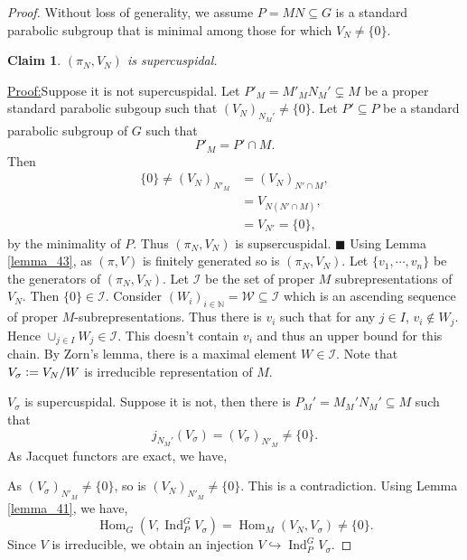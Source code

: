 \documentclass[8pt]{article}
\newtheorem{claim}{Claim}
\newenvironment{claimproof}[1]{\par\noindent\underline{Proof:}\space#1}{\hfill $\blacksquare$}
\DeclareMathOperator{\Ind}{Ind}
\DeclareMathOperator{\Hom}{Hom}
\newcommand{\defeq}{\vcentcolon=}
\newcommand{\N}[0]{\mathbb{N}}
\begin{document}
  \setcounter{claim}{0}
\begin{proof}
  Without loss of generality, we assume $P=MN\subseteq G$ is a standard parabolic subgroup that is minimal among those for which $V_N\not=\{0\}$.
  \begin{claim}
    $(\pi_N,V_N)$ is supercuspidal. 
  \end{claim}
  \begin{claimproof}
    Suppose it is not supercuspidal. Let $P'_M=M'_MN_M'\subsetneq M$ be a proper standard parabolic subgoup such that $(V_N)_{N_M'}\not=\{0\}$. Let $P'\subseteq P$ be a standard parabolic subgroup of $G$ such that 
    \begin{equation*}
      P'_M=P'\cap M.
    \end{equation*}
    Then 
    \begin{align*}
      \{0\}\not=(V_N)_{N'_M} & = (V_N)_{N'\cap M},\\
      & = V_{N(N'\cap M)},\\
      & = V_{N'} =\{0\},
    \end{align*}
    by the minimality of $P$. Thus $(\pi_N,V_N)$ is supsercuspidal. %
  \end{claimproof}
  Using Lemma \ref{lemma_43}, as $(\pi,V)$ is finitely generated so is $(\pi_N,V_N)$. Let $\{v_1,\cdots,v_n\}$ be the generators of $(\pi_N,V_N)$. Let $\mathscr{I}$ be the set of proper $M$ subrepresentations of $V_N$. Then $\{0\}\in\mathscr{I}$. Consider $(W_i)_{i\in \N}=\mathscr{W}\subseteq\mathscr{I}$ which is an ascending sequence of proper $M$-subrepresentations. Thus there is $v_i$ such that for any $j\in I$, $v_i\not\in W_j$.
  Hence $\cup_{j\in I}W_j\in\mathscr{I}$. This doesn't contain $v_i$ and thus an upper bound for this chain. By Zorn's lemma, there is a maximal element $W\in\mathscr{I}$. Note that $V_\sigma\defeq V_N/W$ is irreducible representation of $M$. 
  \par $V_\sigma$ is supercuspidal. Suppose it is not, then there is $P_M'=M_M'N_M'\subseteq M$ such that 
  \begin{equation*}
    j_{N_M'}(V_\sigma)=(V_\sigma)_{N'_M}\not=\{0\}.
  \end{equation*}
  As Jacquet functors are exact, we have,
  \begin{center}
  \end{center}
  As $(V_\sigma)_{N'_M}\not=\{0\}$, so is $(V_N)_{N'_M}\not=\{0\}$. This is a contradiction. Using Lemma \ref{lemma_41}, we have,
  \begin{equation*}
    \Hom_G(V,\Ind_P^G V_\sigma)=\Hom_M(V_N,V_\sigma)\not=\{0\}.
  \end{equation*}
  Since $V$ is irreducible, we obtain an injection $V\hookrightarrow\Ind_P^G V_\sigma$.
\end{proof}
\end{document}
